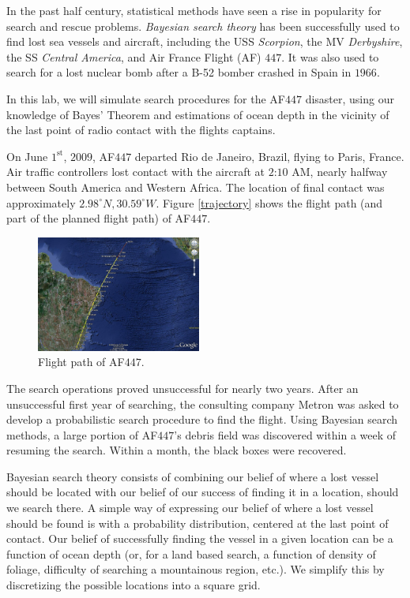 

In the past half century, statistical methods have seen a rise in popularity for search and rescue problems. \emph{Bayesian search theory} has been successfully used to find lost sea vessels and aircraft, including the USS \emph{Scorpion}, the MV \emph{Derbyshire}, the SS \emph{Central America}, and Air France Flight (AF) $447$. It was also used to search for a lost nuclear bomb after a B-52 bomber crashed in Spain in $1966$.

In this lab, we will simulate search procedures for the AF$447$ disaster, using our knowledge of Bayes' Theorem and estimations of ocean depth in the vicinity of the last point of radio contact with the flights captains.

On June $1^{\text{st}}$, $2009$, AF$447$ departed Rio de Janeiro, Brazil, flying to Paris, France. Air traffic controllers lost contact with the aircraft at $2$:$10$ AM, nearly halfway between South America and Western Africa. The location of final contact was approximately $2.98^{\circ} N, 30.59^{\circ} W$. Figure \ref{trajectory} shows the flight path (and part of the planned flight path) of AF$447$.

\begin{figure}[h]
\begin{center}
\includegraphics[height=1.5in]{trajectory.jpg}
\end{center}
\caption{Flight path of AF$447$.}
\end{figure}

The search operations proved unsuccessful for nearly two years. After an unsuccessful first year of searching, the consulting company Metron was asked to develop a probabilistic search procedure to find the flight. Using Bayesian search methods, a large portion of AF$447$'s debris field was discovered within a week of resuming the search. Within a month, the black boxes were recovered.

Bayesian search theory consists of combining our belief of where a lost vessel should be located with our belief of our success of finding it in a location, should we search there. A simple way of expressing our belief of where a lost vessel should be found is with a probability distribution, centered at the last point of contact. Our belief of successfully finding the vessel in a given location can be a function of ocean depth (or, for a land based search, a function of density of foliage, difficulty of searching a mountainous region, etc.). We simplify this by discretizing the possible locations into a square grid.

